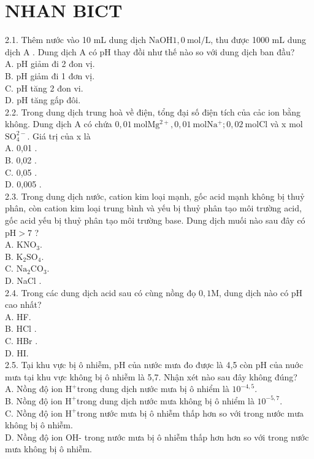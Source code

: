 \documentclass[10pt]{article}
\begin{document}
\section*{NHAN BICT}
2.1. Thêm nước vào 10 mL dung dịch $\mathrm{NaOH} 1,0 \mathrm{~mol} / \mathrm{L}$, thu được 1000 mL dung dịch A . Dung dịch A có pH thay đồi như thế nào so với dung dịch ban đầu?\\
A. pH giảm đi 2 đon vị.\\
B. pH giảm đi 1 đơn vị.\\
C. pH tăng 2 đon vi.\\
D. pH tăng gấp đôi.\\
2.2. Trong dung dịch trung hoà về điện, tổng đại số điện tích của cảc ion bằng không. Dung dịch A có chứa $0,01 \mathrm{~mol} \mathrm{Mg}{ }^{2+}, 0,01 \mathrm{~mol} \mathrm{Na}{ }^{+} ; 0,02 \mathrm{~mol} \mathrm{Cl}$ và x mol $\mathrm{SO}_{4}^{2-}$. Giá trị của x là\\
A. 0,01 .\\
B. 0,02 .\\
C. 0,05 .\\
D. 0,005 .\\
2.3. Trong dung dịch nước, cation kim loại mạnh, gốc acid mạnh không bị thuỷ phân, còn cation kim loại trung bình và yếu bị thuỷ phân tạo môi trường acid, gốc acid yếu bị thuỷ phân tạo môi trường base. Dung dịch muối nào sau đây có $\mathrm{pH}>7$ ?\\
A. $\mathrm{KNO}_{3}$.\\
B. $\mathrm{K}_{2} \mathrm{SO}_{4}$.\\
C. $\mathrm{Na}_{2} \mathrm{CO}_{3}$.\\
D. NaCl .\\
2.4. Trong các dung dịch acid sau có cùng nồng đọ $0,1 \mathrm{M}$, dung dịch nào có pH cao nhất?\\
A. HF.\\
B. HCl .\\
C. HBr .\\
D. HI.\\
2.5. Tại khu vực bị ô nhiễm, pH của nước mưa đo được là 4,5 còn pH của nuớc mưa tại khu vực không bị ô nhiễm là 5,7. Nhận xét nào sau đây không đúng?\\
A. Nồng độ ion $\mathrm{H}^{+}$trong dung dịch nước mưa bị ô nhiểm là $10^{-4,5}$.\\
B. Nồng độ ion $\mathrm{H}^{+}$trong dung dịch nước mưa không bị ô nhiểm là $10^{-5,7}$.\\
C. Nồng độ ion $\mathrm{H}^{+}$trong nước mưa bị ô nhiễm thấp hơn so với trong nước mưa không bị ô nhiễm.\\
D. Nồng độ ion OH- trong nước mưa bị ô nhiễm thấp hơn hơn so với trong nước mưa không bị ô nhiễm.
\end{document}
